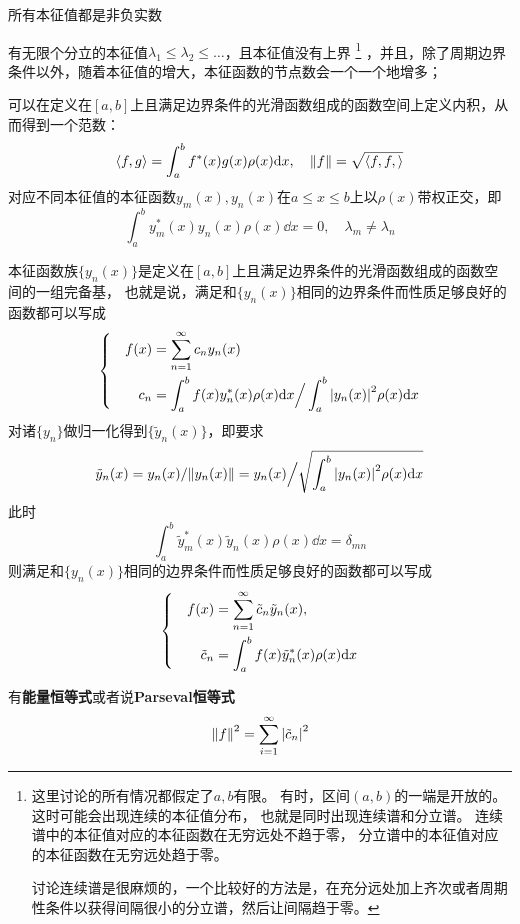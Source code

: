 \documentclass[UTF8]{ctexart}
\newenvironment{bigcase}{\left\{ \quad \begin{aligned}}{\end{aligned}\right.}
\renewenvironment{itemize}{\begin{compactitem}}{\end{compactitem}}
\begin{document}
\begin{itemize}
    \item 所有本征值都是非负实数
    \item 有无限个分立的本征值$\lambda_1 \leq \lambda_2 \leq \ldots$，且本征值没有上界%
    \footnote{
        这里讨论的所有情况都假定了$a, b$有限。
        有时，区间$(a, b)$的一端是开放的。这时可能会出现连续的本征值分布，
        也就是同时出现连续谱和分立谱。
        连续谱中的本征值对应的本征函数在无穷远处不趋于零，
        分立谱中的本征值对应的本征函数在无穷远处趋于零。

        讨论连续谱是很麻烦的，一个比较好的方法是，在充分远处加上齐次或者周期性条件以获得间隔很小的分立谱，然后让间隔趋于零。
    }%
    ，并且，除了周期边界条件以外，随着本征值的增大，本征函数的节点数会一个一个地增多；
    \item 可以在定义在$[a, b]$上且满足边界条件的光滑函数组成的函数空间上定义内积，从而得到一个范数：
    \[
        \langle f, g \rangle = \int_a^b f^*(x) g(x) \rho(x) \dd x, \quad \norm{f} = \sqrt{\langle f, f, \rangle}
    \]
    对应不同本征值的本征函数$y_m(x), y_n(x)$在$a \leq x \leq b$上以$\rho(x)$带权正交，即
    \begin{equation}
        \int_a^b y_m^*(x) y_n(x) \rho(x) \dd x = 0, \quad \lambda_m \neq \lambda_n
    \end{equation}
    \item 本征函数族$\{y_n(x)\}$是定义在$[a, b]$上且满足边界条件的光滑函数组成的函数空间的一组完备基，
    也就是说，满足和$\{y_n(x)\}$相同的边界条件而性质足够良好的函数都可以写成
    \begin{equation}
        \begin{bigcase}
            f(x) &= \sum_{n=1}^\infty c_n y_n (x) \\
            c_n &= \int_a^b f(x) y_n^*(x) \rho(x) \dd x \Big/ \int_a^b \abs{y_n(x)}^2 \rho(x) \dd x
        \end{bigcase}
    \end{equation}
    对诸$\{y_n\}$做归一化得到$\{\tilde{y}_n(x)\}$，即要求
    \[
        \tilde{y}_n(x) = y_n(x) / \norm{y_n(x)} = y_n(x) \Big/ \sqrt{\int_a^b \abs{y_n(x)}^2 \rho(x) \dd x}
    \]
    此时
    \[
        \int_a^b \tilde{y}^*_m(x) \tilde{y}_n(x) \rho(x) \dd x = \delta_{mn}
    \]
    则满足和$\{y_n(x)\}$相同的边界条件而性质足够良好的函数都可以写成
    \begin{equation}
        \begin{bigcase}
            f(x) &= \sum_{n=1}^\infty \tilde{c}_n \tilde{y}_n(x), \\
            \tilde{c}_n &= \int_a^b f(x) \tilde{y}^*_n(x) \rho(x) \dd x
        \end{bigcase}
    \end{equation}
    \item 有\textbf{能量恒等式}或者说\textbf{Parseval恒等式}
    \begin{equation}
        \norm{f}^2 = \sum_{i=1}^\infty \abs{\tilde{c}_n}^2
    \end{equation}
\end{itemize}
\end{document}
